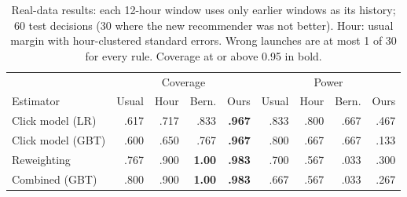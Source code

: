 \begin{table}[t]
\centering
\caption{Real-data results: each 12-hour window uses only earlier windows as its history; 60 test decisions (30 where the new recommender was not better). Hour: usual margin with hour-clustered standard errors. Wrong launches are at most 1 of 30 for every rule. Coverage at or above 0.95 in bold.}
\label{tab:obd}
\small
\begin{tabular}{lrrrrrrrr}
\toprule
& \multicolumn{4}{c}{Coverage} & \multicolumn{4}{c}{Power} \\
Estimator & Usual & Hour & Bern. & Ours & Usual & Hour & Bern. & Ours \\
\midrule
Click model (LR) & .617 & .717 & .833 & \textbf{.967} & .833 & .800 & .667 & .467 \\
Click model (GBT) & .600 & .650 & .767 & \textbf{.967} & .800 & .667 & .667 & .133 \\
Reweighting & .767 & .900 & \textbf{1.00} & \textbf{.983} & .700 & .567 & .033 & .300 \\
Combined (GBT) & .800 & .900 & \textbf{1.00} & \textbf{.983} & .667 & .567 & .033 & .267 \\
\bottomrule
\end{tabular}
\end{table}
